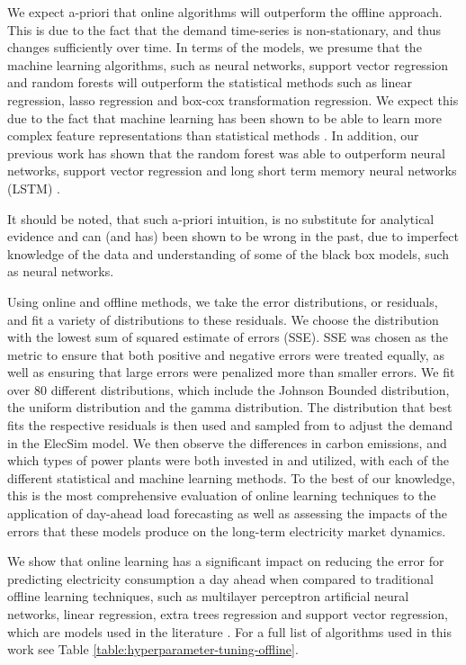 \documentclass[final,3p,times,twocolumn,numbers]{elsarticle}
\begin{document}
We expect a-priori that online algorithms will outperform the offline approach. This is due to the fact that the demand time-series is non-stationary, and thus changes sufficiently over time. In terms of the models, we presume that the machine learning algorithms, such as neural networks, support vector regression and random forests will outperform the statistical methods such as linear regression, lasso regression and box-cox transformation regression. We expect this due to the fact that machine learning has been shown to be able to learn more complex feature representations than statistical methods \cite{Singh2012}. In addition, our previous work has shown that the random forest was able to outperform neural networks, support vector regression and long short term memory neural networks (LSTM) \cite{Kell2018}. 

It should be noted, that such a-priori intuition, is no substitute for analytical evidence and can (and has) been shown to be wrong in the past, due to imperfect knowledge of the data and understanding of some of the black box models, such as neural networks.



Using online and offline methods, we take the error distributions, or residuals, and fit a variety of distributions to these residuals. We choose the distribution with the lowest sum of squared estimate of errors (SSE). SSE was chosen as the metric to ensure that both positive and negative errors were treated equally, as well as ensuring that large errors were penalized more than smaller errors. We fit over 80 different distributions, which include the Johnson Bounded distribution, the uniform distribution and the gamma distribution. The distribution that best fits the respective residuals is then used and sampled from to adjust the demand in the ElecSim model. We then observe the differences in carbon emissions, and which types of power plants were both invested in and utilized, with each of the different statistical and machine learning methods. To the best of our knowledge, this is the most comprehensive evaluation of online learning techniques to the application of day-ahead load forecasting as well as assessing the impacts of the errors that these models produce on the long-term electricity market dynamics.





We show that online learning has a significant impact on reducing the error for predicting electricity consumption a day ahead when compared to traditional offline learning techniques, such as multilayer perceptron artificial neural networks, linear regression, extra trees regression and support vector regression, which are models used in the literature \cite{Lu1993, Ahmad2017, Chen2004}. For a full list of algorithms used in this work see Table \ref{table:hyperparameter-tuning-offline}.
\end{document}
